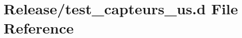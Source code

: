 \hypertarget{test__capteurs__us_8d}{}\section{Release/test\+\_\+capteurs\+\_\+us.d File Reference}
\label{test__capteurs__us_8d}
